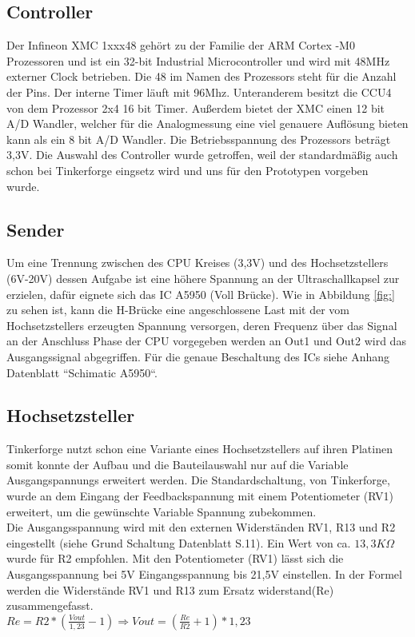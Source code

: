 \subsection{Controller}
Der Infineon XMC 1xxx48 gehört zu der Familie der ARM Cortex -M0 Prozessoren und ist ein 32-bit Industrial Microcontroller und wird mit 48MHz externer Clock betrieben. Die 48 im Namen des Prozessors steht für die Anzahl der Pins. Der interne Timer läuft mit 96Mhz. Unteranderem besitzt die CCU4 von dem Prozessor 2x4 16 bit Timer. Außerdem bietet der XMC einen 12 bit A/D Wandler, welcher für die Analogmessung eine viel genauere Auflösung bieten kann als ein 8 bit A/D Wandler. Die Betriebsspannung des Prozessors beträgt 3,3V. Die Auswahl des Controller wurde getroffen, weil der standardmäßig auch schon bei Tinkerforge eingsetz wird und uns für den Prototypen vorgeben wurde.\


\subsection{Sender}%
Um eine Trennung zwischen des CPU Kreises (3,3V) und des Hochsetzstellers (6V-20V) dessen Aufgabe ist eine höhere Spannung an der Ultraschallkapsel zur erzielen, dafür eignete sich das IC A5950 (Voll Brücke).
Wie in Abbildung \ref{fig:} zu sehen ist, kann die H-Brücke eine angeschlossene Last mit der vom Hochsetzstellers erzeugten Spannung versorgen, deren Frequenz über das Signal an der Anschluss Phase der CPU vorgegeben werden an Out1 und Out2 wird das Ausgangssignal abgegriffen. Für die genaue Beschaltung des ICs siehe Anhang Datenblatt “Schimatic A5950“.


\subsection{Hochsetzsteller}%

Tinkerforge nutzt schon eine Variante eines Hochsetzstellers auf ihren Platinen somit konnte der Aufbau und die Bauteilauswahl nur auf die Variable Ausgangspannungs erweitert werden. Die Standardschaltung, von Tinkerforge, wurde an dem Eingang der Feedbackspannung mit einem Potentiometer (RV1) erweitert, um die gewünschte Variable Spannung zubekommen.\\
Die Ausgangsspannung wird mit den externen Widerständen RV1, R13 und R2 eingestellt (siehe Grund Schaltung Datenblatt S.11). Ein Wert von ca. \(\displaystyle 13,3 K\Omega \) wurde für R2 empfohlen. Mit den Potentiometer (RV1) lässt sich die Ausgangsspannung bei 5V Eingangsspannung bis 21,5V einstellen. In der Formel werden die Widerstände RV1 und R13 zum Ersatz widerstand(Re) zusammengefasst.
\onehalfspacing \\
\(\displaystyle Re=R2*\left(\frac{Vout}{1,23}-1\right) \Rightarrow Vout=\left(\frac{Re}{R2}+1\right)*1,23\) 
\singlespacing



